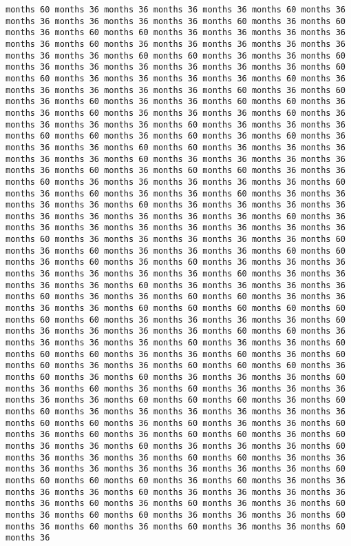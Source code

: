 \documentclass[11pt]{article}
\begin{document}
\begin{Verbatim}[commandchars=\\\{\}, frame=single, framerule=2mm, rulecolor=\color{outerrorbackground}]
months 60 months 36 months 36 months 36 months 36 months 60 months 36 months 36 months 36 months 36 months 36 months 60 months 36 months 60 months 36 months 60 months 60 months 36 months 36 months 36 months 36 months 36 months 60 months 36 months 36 months 36 months 36 months 36 months 36 months 36 months 60 months 60 months 36 months 36 months 60 months 36 months 36 months 36 months 36 months 36 months 36 months 60 months 60 months 36 months 36 months 36 months 36 months 60 months 36 months 36 months 36 months 36 months 36 months 60 months 36 months 60 months 36 months 60 months 36 months 36 months 60 months 60 months 36 months 36 months 60 months 36 months 36 months 36 months 60 months 36 months 36 months 36 months 36 months 60 months 36 months 36 months 36 months 60 months 60 months 36 months 60 months 36 months 60 months 36 months 36 months 36 months 60 months 60 months 36 months 36 months 36 months 36 months 36 months 60 months 36 months 36 months 36 months 36 months 36 months 60 months 36 months 60 months 60 months 36 months 36 months 60 months 36 months 36 months 36 months 36 months 36 months 60 months 36 months 60 months 36 months 36 months 60 months 36 months 36 months 36 months 36 months 60 months 36 months 36 months 36 months 36 months 36 months 36 months 36 months 36 months 36 months 60 months 36 months 36 months 36 months 36 months 36 months 36 months 36 months 36 months 60 months 36 months 36 months 36 months 36 months 36 months 60 months 36 months 60 months 36 months 36 months 36 months 60 months 60 months 36 months 60 months 36 months 60 months 36 months 36 months 36 months 36 months 36 months 36 months 36 months 60 months 36 months 36 months 36 months 36 months 60 months 36 months 36 months 36 months 36 months 60 months 36 months 36 months 60 months 60 months 36 months 36 months 36 months 36 months 60 months 60 months 60 months 60 months 60 months 60 months 60 months 36 months 36 months 36 months 36 months 60 months 36 months 36 months 36 months 36 months 60 months 60 months 36 months 36 months 36 months 36 months 60 months 36 months 36 months 60 months 60 months 60 months 36 months 36 months 60 months 36 months 60 months 60 months 36 months 36 months 60 months 60 months 60 months 36 months 60 months 36 months 60 months 36 months 36 months 36 months 60 months 36 months 60 months 36 months 60 months 36 months 36 months 36 months 36 months 36 months 60 months 60 months 60 months 36 months 60 months 60 months 36 months 36 months 36 months 36 months 36 months 36 months 60 months 60 months 36 months 60 months 36 months 36 months 60 months 36 months 60 months 36 months 60 months 60 months 36 months 60 months 36 months 36 months 60 months 36 months 36 months 36 months 60 months 36 months 36 months 36 months 60 months 60 months 36 months 36 months 36 months 36 months 36 months 36 months 36 months 36 months 60 months 60 months 60 months 60 months 36 months 60 months 36 months 36 months 36 months 36 months 60 months 36 months 36 months 36 months 36 months 36 months 60 months 36 months 60 months 36 months 36 months 60 months 36 months 60 months 60 months 36 months 36 months 36 months 60 months 36 months 60 months 36 months 60 months 36 months 36 months 60 months 36 
\end{Verbatim}
\end{document}
